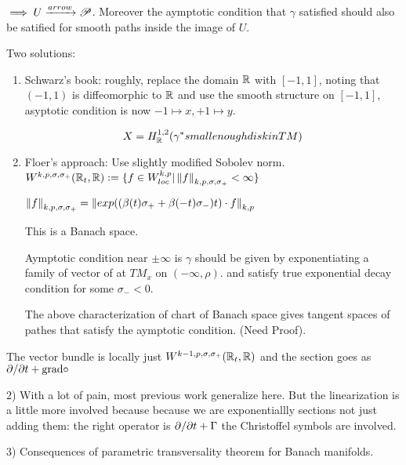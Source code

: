 \documentclass{amsart}
\begin{document}
$\implies U\xrightarrow{arrow}\P$. Moreover the aymptotic condition
that $\gamma$ satisfied should also be satified for smooth paths
inside the image of $U$.

Two solutions:

\begin{enumerate}

\item Schwarz's book: roughly, replace the domain $\R$ with $[-1,1]$, noting that $(-1,1)$ is diffeomorphic to $\R$ and use the smooth structure on $[-1,1]$, asyptotic condition is now $-1\mapsto x, +1\mapsto y$.

  \[
X=H_\R^{1,2}(\gamma^* small enough disk in TM)
\]


\item Floer's approach: Use slightly modified Sobolev norm.
$W^{k,p,\sigma,\sigma_+}(\R_t,\R):=\{f\in W^{k,p}_{loc}|\norm{f}_{k,p,\sigma,\sigma_+}<\infty\}$

$\norm{f}_{k,p,\sigma,\sigma_+}=\norm{exp((\beta(t)\sigma_++\beta(-t)\sigma_-)t)\cdot f}_{k,p}$

This is a Banach space.

Aymptotic condition near $\pm\infty$ is $\gamma$ should be given by exponentiating a family of vector of at $TM_x$ on $(-\infty, \rho)$. and satisfy true exponential decay condition for some $\sigma_-<0$.

The above characterization of chart of Banach space gives tangent spaces of pathes that satisfy the aymptotic condition. (Need Proof).

\end{enumerate}

The vector bundle is locally just $W^{k-1,p,\sigma,\sigma_+}(\R_t,\R)$ and the section goes as $\bd/\bd t+\grad\circ$

2) With a lot of pain, most previous work generalize here. But the linearization is a little more involved because because we are exponentiallly sections not just adding them: the right operator is $\bd/\bd t+\Gamma$ the Christoffel symbols are involved.

3) Consequences of parametric transversality theorem for Banach manifolds.
\end{document}
